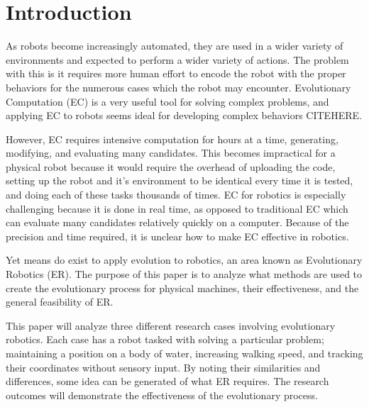 \documentclass{sig-alternate}
\begin{document}


	
\section{Introduction}
 As robots become increasingly automated, they are used in a wider variety of environments and expected to perform a wider variety of actions. The problem with this is it requires more human effort to encode the robot with the proper behaviors for the numerous cases which the robot may encounter. Evolutionary Computation (EC) is a very useful tool for solving complex problems, and applying EC to robots seems ideal for developing complex behaviors CITEHERE. 
 
 However, EC requires intensive computation for hours at a time, generating, modifying, and evaluating many candidates. This becomes impractical for a physical robot because it would require the overhead of uploading the code, setting up the robot and it's environment to be identical every time it is tested, and doing each of these tasks thousands of times. EC for robotics is especially challenging because it is done in real time, as opposed to traditional EC which can evaluate many candidates relatively quickly on a computer. Because of the precision and time required, it is unclear how to make EC effective in robotics.
 
 Yet means do exist to apply evolution to robotics, an area known as Evolutionary Robotics (ER). The purpose of this paper is to analyze what methods are used to create the evolutionary process for physical machines, their effectiveness, and the general feasibility of ER.
 
 This paper will analyze three different research cases involving evolutionary robotics. Each case has a robot tasked with solving a particular problem; maintaining a position on a body of water, increasing walking speed, and tracking their coordinates without sensory input.  By noting their similarities and differences, some idea can be generated of what ER requires. The research outcomes will demonstrate the effectiveness of the evolutionary process.
\end{document}
